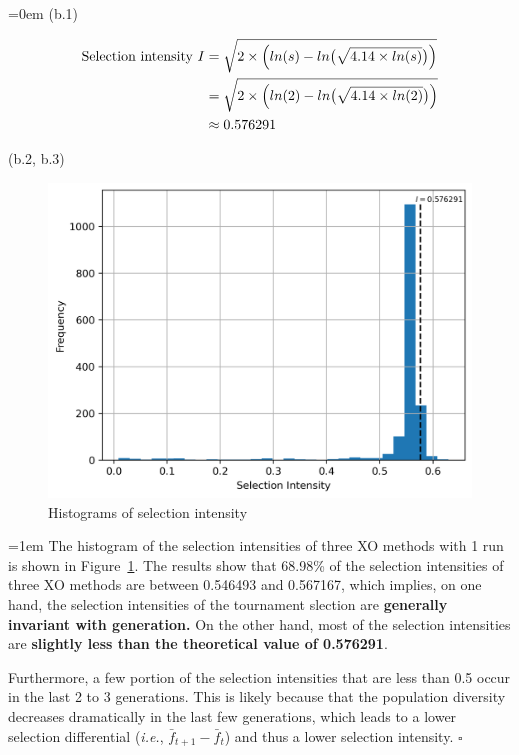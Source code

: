 \documentclass{article}
\begin{document}
\begin{enumerate}[label=(\alph*)]
      \parindent=0em
      (b.1)
      
            \begin{equation*}
            \begin{aligned}
                  \text{Selection intensity } I &= \sqrt{2 \times \Bigl ( ln(s) - ln \bigl (\sqrt{4.14 \times ln(s)}\bigr ) \Bigr )} \\
                  &=  \sqrt{2 \times \Bigl ( ln(2) - ln \bigl (\sqrt{4.14 \times ln(2)}\bigr ) \Bigr )} \\
                  &\approx 0.576291 \\
            \end{aligned}
            \end{equation*}

      (b.2, b.3)
      
      
      \begin{figure}[ht]
            \centering
            \includegraphics[width=0.7\linewidth]{fig-intensity_hist.png}
            \caption{Histograms of selection intensity}
            \label{fig:intensity}
      \end{figure}
      
            \parindent=1em
            The histogram of the selection intensities of three XO methods with 1 run is shown in 
            Figure~\ref{fig:intensity}. The results show that 68.98\% of the selection intensities of three 
            XO methods are between 0.546493 and 0.567167, which implies, on one hand, the selection intensities
            of the tournament slection are \textbf{generally invariant with generation.} 
            On the other hand, most of the selection intensities are \textbf{slightly less than the theoretical value of 0.576291}.
            
            Furthermore, a few portion of the selection intensities that are less than 0.5 occur in the last 2 to 3 generations. 
            This is likely because that the population diversity 
            decreases dramatically in the last few generations, which leads to a lower selection
            differential (\textit{i.e.}, $\bar{f}_{t+1} - \bar{f}_{t}$) and thus a lower selection intensity. \hfill $\square$


\end{enumerate}
\end{document}
